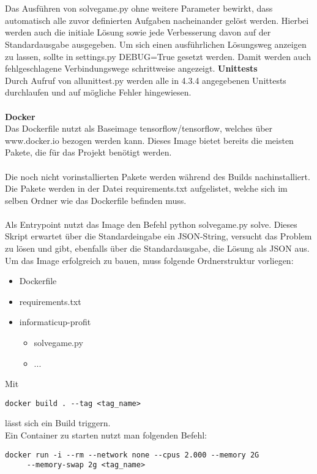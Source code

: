 \\\\
Das Ausführen von solve\textunderscore{}game.py ohne weitere Parameter bewirkt, dass automatisch alle zuvor definierten Aufgaben nacheinander gelöst werden. Hierbei werden auch die initiale Lösung sowie jede Verbesserung davon auf der Standardausgabe ausgegeben. Um sich einen ausführlichen Lösungsweg anzeigen zu lassen, sollte in settings.py DEBUG=True gesetzt werden. Damit werden auch fehlgeschlagene Verbindungswege schrittweise angezeigt.
\newpage
\textbf{Unittests}\\
Durch Aufruf von all\textunderscore{}unit\textunderscore{}test.py werden alle in 4.3.4 angegebenen Unittests durchlaufen und auf mögliche Fehler hingewiesen.
\\\\
\textbf{Docker}\\
Das Dockerfile nutzt als Baseimage tensorflow/tensorflow, welches über www.docker.io bezogen werden kann. Dieses Image bietet bereits die meisten Pakete, die für das Projekt benötigt werden.
\\\\
Die noch nicht vorinstallierten Pakete werden während des Builds nachinstalliert. Die Pakete werden in der Datei requirements.txt aufgelistet, welche sich im selben Ordner wie das Dockerfile befinden muss.
\\\\
Als Entrypoint nutzt das Image den Befehl python solve\textunderscore{}game.py solve. Dieses Skript erwartet über die Standardeingabe ein JSON-String, versucht das Problem zu lösen und gibt, ebenfalls über die Standardausgabe, die Lösung als JSON aus.
\\
Um das Image erfolgreich zu bauen, muss folgende Ordnerstruktur vorliegen:
\begin{itemize}
	\item Dockerfile
	\item requirements.txt
	\item informaticup-profit
	\begin{itemize}
		\item solve\textunderscore{}game.py
		\item ...
	\end{itemize}
\end{itemize}

Mit 
\begin{verbatim}docker build . --tag <tag_name>\end{verbatim}
lässt sich ein Build triggern. 
\\
Ein Container zu starten nutzt man folgenden Befehl:
\begin{verbatim}docker run -i --rm --network none --cpus 2.000 --memory 2G
	 --memory-swap 2g <tag_name>\end{verbatim}

